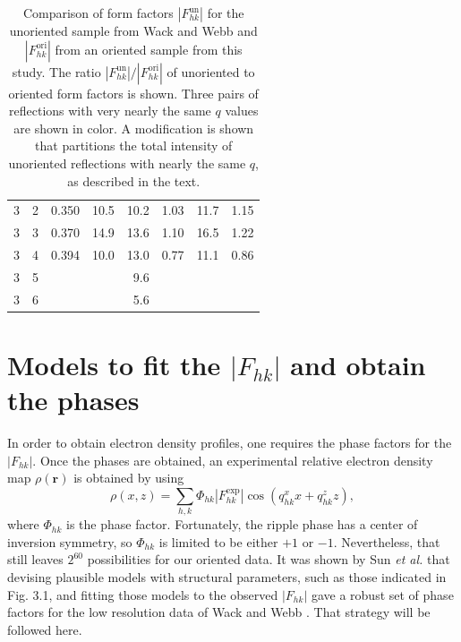 \begin{table}[htbp]
\begin{tabular}{rrrrrrrr}
    3 &  2 & 0.350                & 10.5  & 10.2  & 1.03 & 11.7  & 1.15 \\
    3 &  3 & 0.370                & 14.9  & 13.6  & 1.10 & 16.5  & 1.22 \\
    3 &  4 & 0.394                & 10.0  & 13.0  & 0.77 & 11.1  & 0.86 \\
    3 &  5 &                      &       & 9.6   &                     \\
    3 &  6 &                      &       & 5.6   &                     \\
    \hline
  \end{tabular}
  \caption{Comparison of form factors $\left|F_{hk}^\text{un}\right|$ for the 
  unoriented sample from Wack and Webb \cite{ref:Wack89} and 
  $\left|F_{hk}^\text{ori}\right|$ from an oriented sample from this study. 
  The ratio $\left|F_{hk}^\text{un}\right|/\left|F_{hk}^\text{ori}\right|$ of 
  unoriented to oriented form factors is shown.  Three pairs of reflections 
  with very nearly the same $q$ values are shown in color.  A modification is 
  shown that partitions the total intensity of unoriented reflections with 
  nearly the same $q$, as described in the text.}
  \label{tab:cmu_vs_wack}
\end{table}

\newpage
\section{Models to fit the $|F_{hk}|$ and obtain the phases}\label{sec:LAXS_models}
In order to obtain electron density profiles, one requires the phase factors 
for the $|F_{hk}|$.  
Once the phases are obtained, an experimental relative electron density map 
$\rho(\mathbf{r})$ is obtained
by using
\begin{equation}
  \rho(x,z) = \sum_{h,k} \Phi_{hk} \left|F_{hk}^\text{exp}\right| \cos(q_{hk}^xx+q_{hk}^zz),
  \label{eq:Fourier_reconstruction}
\end{equation}
where $\Phi_{hk}$ is the phase factor.  
Fortunately, the ripple phase has a center of inversion symmetry, so 
$\Phi_{hk}$ is limited to be either $+1$ or $-1$. Nevertheless, that still 
leaves $2^{60}$ possibilities for our oriented data.  
It was shown by Sun \textit{et al.} \cite{ref:Sun96} that devising plausible 
models with structural parameters, such as those indicated in Fig. 3.1, and 
fitting those models to the observed $|F_{hk}|$ gave a robust set of phase 
factors for the low resolution data of Wack and Webb \cite{ref:Wack89}.  
That strategy will be followed here.

